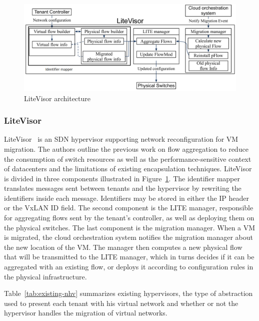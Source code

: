 

\begin{figure}[ht]
    \centering
    \includegraphics[scale=0.5]{figures/litevisor.pdf}
    \caption{LiteVisor architecture~\cite{Litevisor-Yang2018}}
    \label{fig:litevisor}
\end{figure}

\subsubsection{LiteVisor}
LiteVisor~\cite{Litevisor-Yang2018} is an SDN hypervisor supporting network reconfiguration for VM migration.
The authors outline the previous work on flow aggregation to reduce the consumption of switch resources as well as the performance-sensitive context of datacenters and the limitations of existing encapsulation techniques.
LiteVisor is divided in three components illustrated in Figure~\ref{fig:litevisor}. The identifier mapper translates messages sent between tenants and the hypervisor by rewriting the identifiers inside each message. Identifiers may be stored in either the IP header or the VxLAN ID field.
The second component is the LITE manager, responsible for aggregating flows sent by the tenant's controller, as well as deploying them on the physical switches. 
The last component is the migration manager. When a VM is migrated, the cloud orchestration system notifies the migration manager about the new location of the VM. The manager then computes a new physical flow that will be transmitted to the LITE manager, which in turns decides if it can be aggregated with an existing flow, or deploys it according to configuration rules in the physical infrastructure.




Table~\ref{tab:existing-nhv} summarizes existing hypervisors, the type of abstraction used to present each tenant with his virtual network and whether or not the hypervisor handles the migration of virtual networks.
